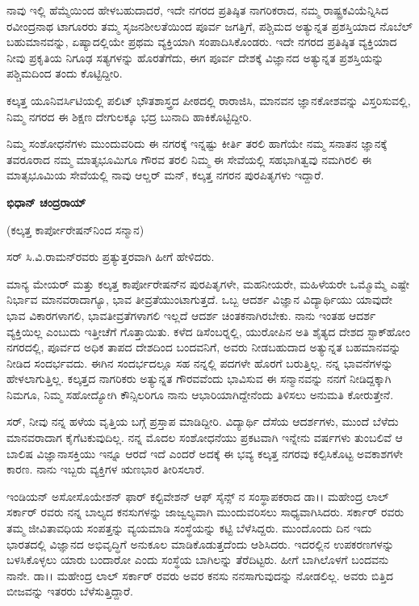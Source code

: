 ನಾವು ಇಲ್ಲಿ ಹೆಮ್ಮೆಯಿಂದ ಹೇಳಬಹುದಾದರೆ, ಇದೇ ನಗರದ ಪ್ರತಿಷ್ಠಿತ ನಾಗರಿಕರಾದ, ನಮ್ಮ ರಾಷ್ಟ್ರಕವಿಯೆನ್ನಿಸಿದ ರವೀಂದ್ರನಾಥ ಟಾಗೂರರು ತಮ್ಮ ಸೃಜನಶೀಲತೆಯಿಂದ ಪೂರ್ವ ಜಗತ್ತಿಗೆ, ಪಶ್ಚಿಮದ ಅತ್ಯುನ್ನತ ಪ್ರಶಸ್ತಿಯಾದ ನೊಬೆಲ್ ಬಹುಮಾನವನ್ನು, ಏಷ್ಯಾದಲ್ಲಿಯೇ ಪ್ರಥಮ ವ್ಯಕ್ತಿಯಾಗಿ ಸಂಪಾದಿಸಿಕೊಂಡರು. ಇದೇ ನಗರದ ಪ್ರತಿಷ್ಠಿತ ವ್ಯಕ್ತಿಯಾದ ನೀವು ಪ್ರಕೃತಿಯ ನಿಗೂಢ ಸತ್ಯಗಳನ್ನು ಹೊರತೆಗೆದು, ಈಗ ಪೂರ್ವ ದೇಶಕ್ಕೆ ವಿಜ್ಞಾನದ ಅತ್ಯುನ್ನತ ಪ್ರಶಸ್ತಿಯನ್ನು ಪಶ್ಚಿಮದಿಂದ ತಂದು ಕೊಟ್ಟಿದ್ದೀರಿ.

ಕಲ್ಕತ್ತ ಯೂನಿವರ್ಸಿಟಿಯಲ್ಲಿ ಪಲಿಟ್ ಭೌತಶಾಸ್ತ್ರದ ಪೀಠದಲ್ಲಿ ರಾರಾಜಿಸಿ, ಮಾನವನ ಜ್ಞಾನಕೋಶವನ್ನು ವಿಸ್ತರಿಸುವಲ್ಲಿ, ನಿಮ್ಮ ನಗರದ ಈ ಶಿಕ್ಷಣ ದೇಗುಲಕ್ಕೂ ಭದ್ರ ಬುನಾದಿ ಹಾಕಿಕೊಟ್ಟಿದ್ದೀರಿ.

ನಿಮ್ಮ ಸಂಶೋಧನೆಗಳು ಮುಂದುವರಿದು ಈ ನಗರಕ್ಕೆ ಇನ್ನಷ್ಟು ಕೀರ್ತಿ ತರಲಿ ಹಾಗೆಯೇ ನಮ್ಮ ಸನಾತನ ಜ್ಞಾನಕ್ಕೆ ತವರೂರಾದ ನಮ್ಮ ಮಾತೃಭೂಮಿಗೂ ಗೌರವ ತರಲಿ ನಿಮ್ಮ ಈ ಸೇವೆಯಲ್ಲಿ ಸಹಭಾಗಿತ್ವವು ನಮಗಿರಲಿ ಈ ಮಾತೃಭೂಮಿಯ ಸೇವೆಯಲ್ಲಿ ನಾವು ಆಲ್ಡರ್ ಮನ್, ಕಲ್ಕತ್ತ ನಗರನ ಪುರಪಿತೃಗಳು ಇದ್ದಾರೆ.

\begin{flushright}
\textbf{ಭಿಧಾನ್ ಚಂದ್ರರಾಯ್}
\end{flushright}

\newpage

(ಕಲ್ಕತ್ತ ಕಾರ್ಪೋರೇಷನ್‍ನಿಂದ ಸನ್ಮಾನ)

ಸರ್ ಸಿ.ವಿ.ರಾಮನ್‍ರವರು ಪ್ರತ್ಯುತ್ತರವಾಗಿ ಹೀಗೆ ಹೇಳಿದರು.

ಮಾನ್ಯ ಮೇಯರ್ ಮತ್ತು ಕಲ್ಕತ್ತ ಕಾರ್ಪೋರೇಷನ್‍ನ ಪುರಪಿತೃಗಳೇ, ಮಹನೀಯರೇ, ಮಹಿಳೆಯರೇ ಒಮ್ಮೊಮ್ಮೆ ಎಷ್ಟೇ ನಿರ್ಭಾವ ಮಾನವರಾದಾಗ್ಯೂ, ಭಾವ ತೀವ್ರತೆಯುಂಟಾಗುತ್ತದೆ. ಒಬ್ಬ ಆದರ್ಶ ವಿಜ್ಞಾನ ವಿದ್ಯಾರ್ಥಿಯು ಯಾವುದೇ ಭಾವ ವಿಕಾರಗಳಾಗಲಿ, ಭಾವತೀವ್ರತೆಗಳಾಗಲಿ ಇಲ್ಲದೆ ಆದರ್ಶ ಚಿಂತಕನಾಗಿರಬೇಕು. ನಾನು ಇಂತಹ ಆದರ್ಶ ವ್ಯಕ್ತಿಯಿಲ್ಲ ಎಂಬುದು ಇತ್ತೀಚೆಗೆ ಗೊತ್ತಾಯಿತು. ಕಳೆದ ಡಿಸೆಂಬರ್‍ನಲ್ಲಿ, ಯುರೋಪಿನ ಅತಿ ಶೈತ್ಯದ ದೇಶದ ಸ್ಟಾಕ್‍ಹೋಂ ನಗರದಲ್ಲಿ, ಪೂರ್ವದ ಅಧಿಕ ತಾಪದ ದೇಶದಿಂದ ಬಂದವನಿಗೆ, ಅವರು ನೀಡಬಹುದಾದ ಅತ್ಯುನ್ನತ ಬಹಮಾನವನ್ನು ನೀಡಿದ ಸಂದರ್ಭವದು. ಈಗಿನ ಸಂದರ್ಭದಲ್ಲೂ ಸಹ ನನ್ನಲ್ಲಿ ಪದಗಳೇ ಹೊರಗೆ ಬರುತ್ತಿಲ್ಲ. ನನ್ನ ಭಾವನೆಗಳನ್ನು ಹೇಳಲಾಗುತ್ತಿಲ್ಲ. ಕಲ್ಕತ್ತದ ನಾಗರಿಕರು ಅತ್ಯುನ್ನತ ಗೌರವವೆಂದು ಭಾವಿಸುವ ಈ ಸನ್ಮಾನವನ್ನು ನನಗೆ ನೀಡಿದ್ದಕ್ಕಾಗಿ ನಿಮಗೂ, ನಿಮ್ಮ ಸಹೋದ್ಯೋಗಿ ಕೌನ್ಸಿಲರಿಗೂ ನಾನು ಆಭಾರಿಯಾಗಿದ್ದೇನೆಂದು ತಿಳಿಸಲು ಅನುಮತಿ ಕೋರುತ್ತೇನೆ.

ಸರ್, ನೀವು ನನ್ನ ಹಳೆಯ ವೃತ್ತಿಯ ಬಗ್ಗೆ ಪ್ರಸ್ತಾಪ ಮಾಡಿದ್ದೀರಿ. ವಿದ್ಯಾರ್ಥಿ ದೆಸೆಯ ಆದರ್ಶಗಳು, ಮುಂದೆ ಬೆಳೆದು ಮಾನವರಾದಾಗ ಕೈಗೆಟಕುವುದಿಲ್ಲ. ನನ್ನ ಮೊದಲ ಸಂಶೋಧನೆಯು ಪ್ರಕಟವಾಗಿ ಇನ್ನೇನು  ವರ್ಷಗಳು ತುಂಬಲಿವೆ ಆ ಬಾಲಿಷ ವಿಜ್ಞಾನಾಸಕ್ತಿಯು ಇನ್ನೂ ಆರದೆ ಇದೆ ಎಂದರೆ ಅದಕ್ಕೆ ಈ ಭವ್ಯ ಕಲ್ಕತ್ತ ನಗರವು ಕಲ್ಪಿಸಿಕೊಟ್ಟ ಅವಕಾಶಗಳೇ ಕಾರಣ. ನಾನು ಇಬ್ಬರು ವ್ಯಕ್ತಿಗಳ ಋಣಭಾರ ತೀರಿಸಲಾರೆ.

ಇಂಡಿಯನ್ ಅಸೋಸೊಯೇಶನ್ ಫಾರ್ ಕಲ್ಟಿವೇಶನ್ ಆಫ್ ಸೈನ್ಸ್ ನ ಸಂಸ್ಥಾಪಕರಾದ ಡಾ।। ಮಹೇಂದ್ರ ಲಾಲ್ ಸರ್ಕಾರ್ ರವರು ನನ್ನ ಬಾಲ್ಯದ ಕನಸುಗಳನ್ನು ಜಾಜ್ವಲ್ಯವಾಗಿ ಮುಂದುವರಿಸಲು ಸಾಧ್ಯವಾಗಿಸಿದರು. ಸರ್ಕಾರ್ ರವರು ತಮ್ಮ ಜೀವಿತಾವಧಿಯ ಸಂಪತ್ತನ್ನು ವ್ಯಯಮಾಡಿ ಸಂಸ್ಥೆಯನ್ನು ಕಟ್ಟಿ ಬೆಳೆಸಿದ್ದರು. ಮುಂದೊಂದು ದಿನ ಇದು ಭಾರತದಲ್ಲಿ ವಿಜ್ಞಾನದ ಅಭಿವೃದ್ಧಿಗೆ ಅನುಕೂಲ ಮಾಡಿಕೊಡುತ್ತದೆಂದು ಆಶಿಸಿದರು. ಇದರಲ್ಲಿನ ಉಪಕರಣಗಳನ್ನು ಬಳಸಿಕೊಳ್ಳಲು ಯಾರು ಬಂದಾರೋ ಎಂದು ಸಂಸ್ಥೆಯ ಬಾಗಿಲನ್ನು ತೆರೆದಿಟ್ಟರು. ಹೀಗೆ ಬಾಗಿಲೊಳಗೆ ಬಂದವನು ನಾನೇ. ಡಾ।। ಮಹೇಂದ್ರ ಲಾಲ್ ಸರ್ಕಾರ್ ರವರು ಅವರ ಕನಸು ನನಸಾಗುವುದನ್ನು ನೋಡಲಿಲ್ಲ. ಅವರು ಬಿತ್ತಿದ ಬೀಜವನ್ನು ಇತರರು ಬೆಳೆಸುತ್ತಿದ್ದಾರೆ.

